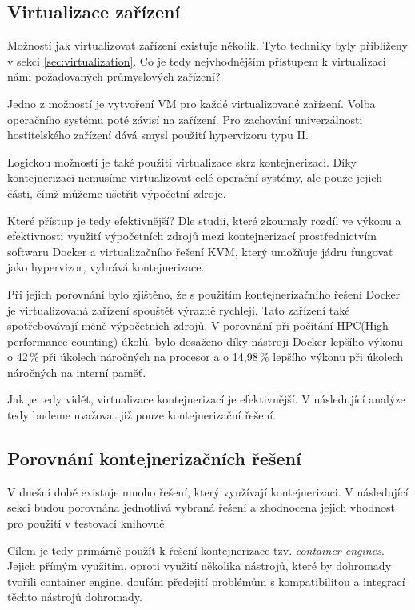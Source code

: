 \subsection{Virtualizace zařízení}

Možností jak virtualizovat zařízení existuje několik. Tyto techniky byly přiblíženy v sekci \ref{sec:virtualization}. Co je tedy nejvhodnějším přístupem k virtualizaci námi požadovaných průmyslových zařízení? 

Jedno z možností je vytvoření VM pro každé virtualizované zařízení. Volba operačního systému poté závisí na zařízení. Pro zachování univerzálnosti hostitelského zařízení dává smysl použití hypervizoru typu II.

Logickou možností je také použití virtualizace skrz kontejnerizaci. Díky kontejnerizaci nemusíme virtualizovat celé operační systémy, ale pouze jejich části, čímž můžeme ušetřit výpočetní zdroje.

Které přístup je tedy efektivnější? Dle studií, které zkoumaly rozdíl ve výkonu a efektivnosti využití výpočetních zdrojů mezi kontejnerizací prostřednictvím softwaru Docker a virtualizačního řešení KVM, který umožňuje jádru fungovat jako hypervizor, vyhrává kontejnerizace. 

Při jejich porovnání bylo zjištěno, že s použitím kontejnerizačního řešení Docker je virtualizovaná zařízení spouštět výrazně rychleji. Tato zařízení také spotřebovávají méně výpočetních zdrojů. V porovnání při počítání HPC(High performance counting) úkolů, bylo dosaženo díky nástroji Docker lepšího výkonu o 42\,\% při úkolech náročných na procesor a o 14,98\,\% lepšího výkonu při úkolech náročných na interní paměť.\cite{kvmdockercomp}\cite{2021virt} 

Jak je tedy vidět, virtualizace kontejnerizací je efektivnější. V následující analýze tedy budeme uvažovat již pouze kontejnerizační řešení. 

\subsection{Porovnání kontejnerizačních řešení}

V dnešní době existuje mnoho řešení, který využívají kontejnerizaci. V následující sekci budou porovnána jednotlivá vybraná řešení a zhodnocena jejich vhodnost pro použití v testovací knihovně. 

Cílem je tedy primárně použít k řešení kontejnerizace tzv. \textit{container engines}. Jejich přímým využitím, oproti využití několika nástrojů, které by dohromady tvořili container engine, doufám předejití problémům s kompatibilitou a integrací těchto nástrojů dohromady.

